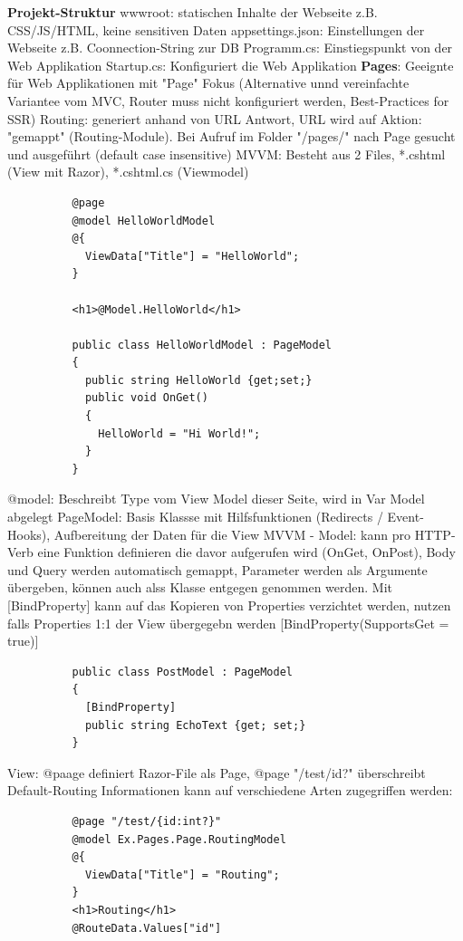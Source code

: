 \documentclass[10pt,landscape]{article}
\begin{document}
\begin{multicols}{3}
        \textbf{Projekt-Struktur}
        wwwroot: statischen Inhalte der Webseite z.B. CSS/JS/HTML, keine sensitiven Daten
        appsettings.json: Einstellungen der Webseite z.B. Coonnection-String zur DB
        Programm.cs: Einstiegspunkt von der Web Applikation
        Startup.cs: Konfiguriert die Web Applikation 
        \textbf{Pages}: Geeignte für Web Applikationen mit "Page" Fokus (Alternative unnd vereinfachte Variantee vom MVC, Router muss nicht konfiguriert werden, Best-Practices for SSR)
        Routing: generiert anhand von URL Antwort, URL wird auf Aktion: "gemappt" (Routing-Module). Bei Aufruf im Folder "/pages/" nach Page gesucht und ausgeführt (default case insensitive)
        MVVM: Besteht aus 2 Files, *.cshtml (View mit Razor), *.cshtml.cs (Viewmodel)
        \begin{lstlisting}
          @page
          @model HelloWorldModel
          @{
            ViewData["Title"] = "HelloWorld";
          }

          <h1>@Model.HelloWorld</h1>

          public class HelloWorldModel : PageModel
          {
            public string HelloWorld {get;set;}
            public void OnGet()
            {
              HelloWorld = "Hi World!";
            }
          }
        \end{lstlisting}
        @model: Beschreibt Type vom View Model dieser Seite, wird in Var Model abgelegt
        PageModel: Basis Klassse mit Hilfsfunktionen (Redirects / Event-Hooks), Aufbereitung der Daten für die View
        MVVM - Model: kann pro HTTP-Verb eine Funktion definieren die davor aufgerufen wird (OnGet, OnPost), Body und Query werden automatisch gemappt, Parameter werden als Argumente übergeben, können auch alss Klasse entgegen genommen werden.
        Mit [BindProperty] kann auf das Kopieren von Properties verzichtet werden, nutzen falls Properties 1:1 der View übergegebn werden [BindProperty(SupportsGet = true)]
        \begin{lstlisting}
          public class PostModel : PageModel
          {
            [BindProperty]
            public string EchoText {get; set;}
          }
        \end{lstlisting}
        View: @paage definiert Razor-File als Page, @page "/test/{id?}" überschreibt Default-Routing Informationen
        kann auf verschiedene Arten zugegriffen werden:
        \begin{lstlisting}
          @page "/test/{id:int?}"
          @model Ex.Pages.Page.RoutingModel
          @{
            ViewData["Title"] = "Routing";
          }
          <h1>Routing</h1>
          @RouteData.Values["id"]


\end{lstlisting}
\end{multicols}
\end{document}
